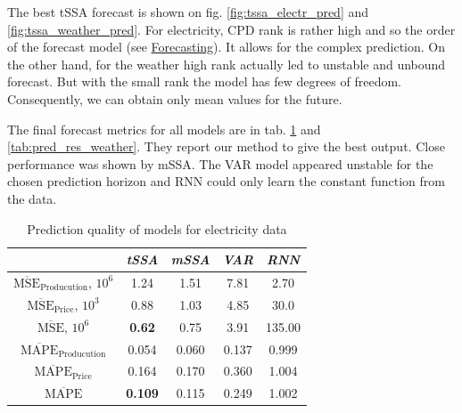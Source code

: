 	The best tSSA forecast is shown on fig. \ref{fig:tssa_electr_pred} and \ref{fig:tssa_weather_pred}. For electricity, CPD rank is rather high and so the order of the forecast model (see \hyperref[sec:tssa_forecast]{Forecasting}). It allows for the complex prediction. On the other hand, for the weather high rank actually led to unstable and unbound forecast. But with the small rank the model has few degrees of freedom. Consequently, we can obtain only mean values for the future.
	
	The final forecast metrics for all models are in tab. \ref{tab:pred_res_electr} and \ref{tab:pred_res_weather}. They report our method to give the best output. Close performance was shown by mSSA. The VAR model appeared unstable for the chosen prediction horizon and RNN could only learn the constant function from the data.
	
	\def\arraystretch{1.1}
	\begin{table}[h]
		\centering
		\caption{Prediction quality of models for electricity data}\label{tab:pred_res_electr}
		\begin{tabular}{|c|c|c|c|c|}
			\hline
			& \textit{tSSA}  & \textit{mSSA} & \textit{VAR} & \textit{RNN} \\ \hline
			$ \overline{\text{MSE}}_{\text{Producution}} $, $10^6$ & 1.24           & 1.51          & 7.81         & 2.70         \\ \hline
			$ \overline{\text{MSE}}_{\text{Price}} $, $10^3$      & 0.88           & 1.03          & 4.85         & 30.0         \\ \hline
			$ \overline{\text{MSE}} $, $10^6$             & \textbf{0.62}  & 0.75          & 3.91         & 135.00       \\ \hline
			$ \overline{\text{MAPE}}_{\text{Producution}} $        & 0.054          & 0.060         & 0.137        & 0.999        \\ \hline
			$ \overline{\text{MAPE}}_{\text{Price}} $             & 0.164          & 0.170         & 0.360        & 1.004        \\ \hline
			$ \overline{\text{MAPE}} $                    & \textbf{0.109} & 0.115         & 0.249        & 1.002        \\ \hline
		\end{tabular}
	\end{table}
	
